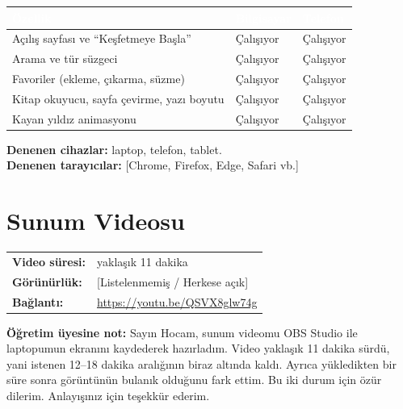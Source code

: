 \documentclass[12pt,a4paper]{article}
\newcommand{\youtubelink}{\url{https://youtu.be/QSVX8glw74g}}
\begin{document}
\begin{center}
\begin{tabular}{@{}p{6cm}p{3.4cm}p{3.4cm}@{}}
\toprule
\rowcolor{ana}\textcolor{white}{\textbf{Özellik}} & \textcolor{white}{\textbf{Bilgisayar}} & \textcolor{white}{\textbf{Telefon}} \\
\midrule
Açılış sayfası ve ``Keşfetmeye Başla'' & Çalışıyor & Çalışıyor \\
Arama ve tür süzgeci & Çalışıyor & Çalışıyor \\
Favoriler (ekleme, çıkarma, süzme) & Çalışıyor & Çalışıyor \\
Kitap okuyucu, sayfa çevirme, yazı boyutu & Çalışıyor & Çalışıyor \\
Kayan yıldız animasyonu & Çalışıyor & Çalışıyor \\
\bottomrule
\end{tabular}
\end{center}

\textbf{Denenen cihazlar:} laptop, telefon, tablet.\\
\textbf{Denenen tarayıcılar:} [Chrome, Firefox, Edge, Safari vb.]

\section{Sunum Videosu}
\begin{center}
\begin{tabular}{@{}ll@{}}
\textbf{Video süresi:} & yaklaşık 11 dakika \\
\textbf{Görünürlük:} & [Listelenmemiş / Herkese açık] \\
\textbf{Bağlantı:} & \youtubelink \\
\end{tabular}
\end{center}

\textbf{Öğretim üyesine not:} Sayın Hocam, sunum videomu OBS Studio ile laptopumun ekranını kaydederek hazırladım. Video yaklaşık 11 dakika sürdü, yani istenen 12--18 dakika aralığının biraz altında kaldı. Ayrıca yükledikten bir süre sonra görüntünün bulanık olduğunu fark ettim. Bu iki durum için özür dilerim. Anlayışınız için teşekkür ederim.
\end{document}
